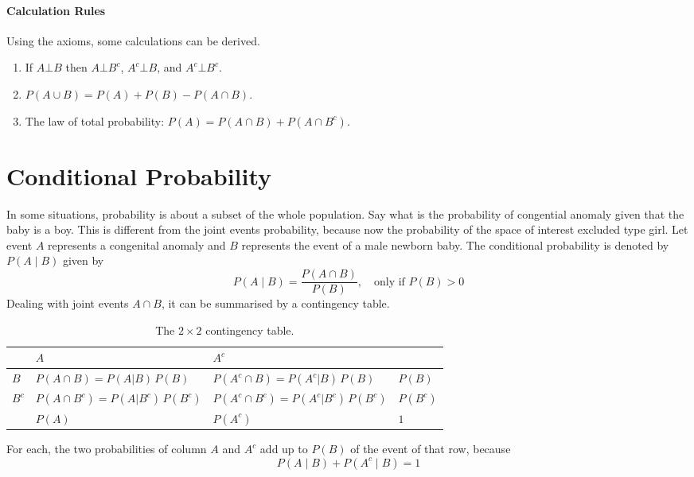 \paragraph{Calculation Rules}
Using the axioms, some calculations can be derived.
\begin{enumerate}
    \item If $A\bot B$ then $A\bot B^c$, $A^c\bot B$, and $A^c\bot B^c$.
    \item $P(A\cup B)=P(A)+P(B)-P(A\cap B)$.
    \item The law of total probability: $P(A)=P(A\cap B)+P(A\cap B^c)$.
\end{enumerate}

\section{Conditional Probability}
In some situations, probability is about a subset of the whole population. Say what is the probability of congential anomaly given that the baby is a boy. This is different from the joint events probability, because now the probability of the space
of interest excluded type girl. Let event $A$ represents a congenital anomaly and $B$ represents the event of a male newborn baby. The conditional probability is denoted by $P(A\mid B)$ given by
\begin{equation}\label{eq:ProbabilityTheory3}
    P(A\mid B)=\frac{P(A\cap B)}{P(B)},\quad\text{only if } P(B)>0
\end{equation}
Dealing with joint events $A\cap B$, it can be summarised by a contingency table.
\begin{table}[H]
    \centering
    \renewcommand{\arraystretch}{1.5}
    \begin{tabular}{l|ll|l}
        \hline
                & $A$                                                        & $A^c$                                                             &           \\
        \hline
        $B$     & $P(A \cap B) = P(A|B)\,P(B)$                        & $P(A^c \cap B) = P(A^c|B)\,P(B)$                           & $P(B)$  \\
        \hline
        $B^c$   & $P(A \cap B^c) = P(A|B^c)\,P(B^c)$                  & $P(A^c \cap B^c) = P(A^c|B^c)\,P(B^c)$                     & $P(B^c)$\\
        \hline
                & $P(A)$                                                   & $P(A^c)$                                                        & $1$       \\
        \hline
    \end{tabular}
    \caption{The $2\times 2$ contingency table.}
    \label{tab:2by2ContingencyTable}
\end{table}
For each, the two probabilities of column $A$ and $A^c$ add up to $P(B)$ of the event of that row, because
\begin{equation}
    P(A\mid B)+P(A^c\mid B)=1
\end{equation}

